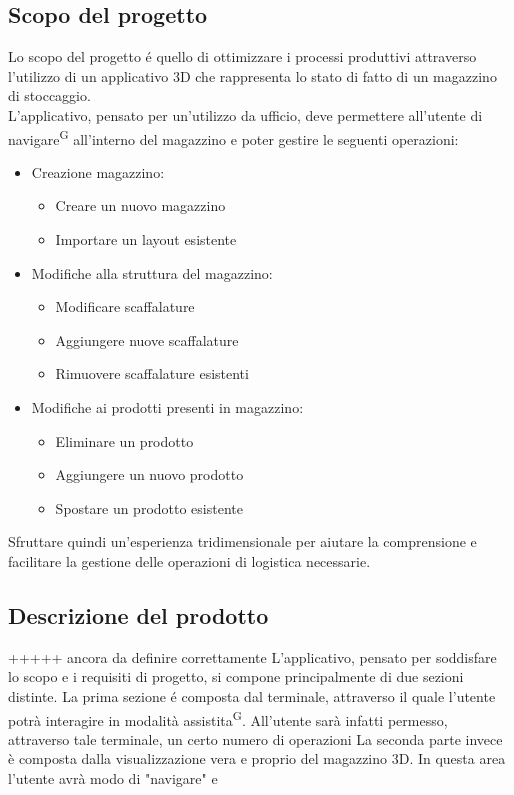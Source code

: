 \subsection{Scopo del progetto}\label{sec:scopo_del_progetto}
Lo scopo del progetto é quello di ottimizzare i processi produttivi attraverso l'utilizzo di 
un applicativo 3D che rappresenta lo stato di fatto di un magazzino di stoccaggio.\\
L'applicativo, pensato per un'utilizzo da ufficio, deve permettere all'utente di navigare\textsuperscript{G} all'interno 
del magazzino e poter gestire le seguenti operazioni:
\begin{itemize}
    \item Creazione magazzino:
        \begin{itemize}
            \item Creare un nuovo magazzino
            \item Importare un layout esistente
        \end{itemize}
    \item Modifiche alla struttura del magazzino:
        \begin{itemize}
            \item Modificare scaffalature
            \item Aggiungere nuove scaffalature
            \item Rimuovere scaffalature esistenti
        \end{itemize}
    \item Modifiche ai prodotti presenti in magazzino:
        \begin{itemize}
            \item Eliminare un prodotto
            \item Aggiungere un nuovo prodotto
            \item Spostare un prodotto esistente 
        \end{itemize}
\end{itemize}
Sfruttare quindi un'esperienza tridimensionale per aiutare la comprensione e facilitare la gestione delle 
operazioni di logistica necessarie. 


\subsection{Descrizione del prodotto}\label{sec:descrizione_del_prodotto}

+++++ ancora da definire correttamente
L'applicativo, pensato per soddisfare lo scopo e i requisiti di progetto, si compone principalmente di due 
sezioni distinte. La prima sezione é composta dal terminale, attraverso il quale l'utente potrà interagire 
in modalità assistita\textsuperscript{G}. All'utente sarà infatti permesso, attraverso tale terminale, un certo numero di 
operazioni 
La seconda parte invece è composta dalla visualizzazione vera e proprio del magazzino 3D. In questa area 
l'utente avrà modo di "navigare" e 

